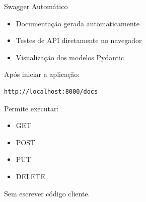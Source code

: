 \documentclass{beamer}
\begin{document}
\begin{frame}[fragile]{Swagger Automático}

\begin{itemize}
    \item Documentação gerada automaticamente
    \item Testes de API diretamente no navegador
    \item Visualização dos modelos Pydantic
\end{itemize}

\vspace{0.3cm}

Após iniciar a aplicação:

\begin{verbatim}
http://localhost:8000/docs
\end{verbatim}

\vspace{0.3cm}

Permite executar:

\begin{itemize}
    \item GET
    \item POST
    \item PUT
    \item DELETE
\end{itemize}

Sem escrever código cliente.

\end{frame}
\end{document}

